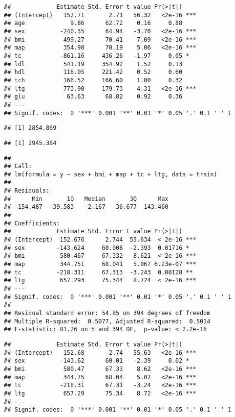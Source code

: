 \documentclass[
]{article}
\begin{document}
\begin{verbatim}
##             Estimate Std. Error t value Pr(>|t|)    
## (Intercept)   152.71       2.71   56.32   <2e-16 ***
## age             9.86      62.72    0.16     0.88    
## sex          -240.35      64.94   -3.70   <2e-16 ***
## bmi           499.27      70.41    7.09   <2e-16 ***
## map           354.98      70.19    5.06   <2e-16 ***
## tc           -861.16     436.26   -1.97     0.05 *  
## ldl           541.19     354.92    1.52     0.13    
## hdl           116.05     221.42    0.52     0.60    
## tch           166.52     166.60    1.00     0.32    
## ltg           773.90     179.73    4.31   <2e-16 ***
## glu            63.63      68.82    0.92     0.36    
## ---
## Signif. codes:  0 '***' 0.001 '**' 0.01 '*' 0.05 '.' 0.1 ' ' 1
\end{verbatim}

\begin{verbatim}
## [1] 2854.869
\end{verbatim}

\begin{verbatim}
## [1] 2945.384
\end{verbatim}

\begin{verbatim}
## 
## Call:
## lm(formula = y ~ sex + bmi + map + tc + ltg, data = train)
## 
## Residuals:
##      Min       1Q   Median       3Q      Max 
## -154.487  -39.583   -2.167   36.677  143.460 
## 
## Coefficients:
##             Estimate Std. Error t value Pr(>|t|)    
## (Intercept)  152.676      2.744  55.634  < 2e-16 ***
## sex         -143.624     60.008  -2.393  0.01716 *  
## bmi          580.467     67.332   8.621  < 2e-16 ***
## map          344.751     68.041   5.067 6.23e-07 ***
## tc          -218.311     67.313  -3.243  0.00128 ** 
## ltg          657.293     75.344   8.724  < 2e-16 ***
## ---
## Signif. codes:  0 '***' 0.001 '**' 0.01 '*' 0.05 '.' 0.1 ' ' 1
## 
## Residual standard error: 54.85 on 394 degrees of freedom
## Multiple R-squared:  0.5077, Adjusted R-squared:  0.5014 
## F-statistic: 81.26 on 5 and 394 DF,  p-value: < 2.2e-16
\end{verbatim}

\begin{verbatim}
##             Estimate Std. Error t value Pr(>|t|)    
## (Intercept)   152.68       2.74   55.63   <2e-16 ***
## sex          -143.62      60.01   -2.39     0.02 *  
## bmi           580.47      67.33    8.62   <2e-16 ***
## map           344.75      68.04    5.07   <2e-16 ***
## tc           -218.31      67.31   -3.24   <2e-16 ***
## ltg           657.29      75.34    8.72   <2e-16 ***
## ---
## Signif. codes:  0 '***' 0.001 '**' 0.01 '*' 0.05 '.' 0.1 ' ' 1
\end{verbatim}
\end{document}
